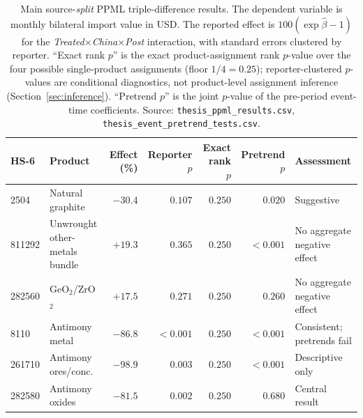 \begin{table}[H]
\centering
\caption{Main source-\emph{split} PPML triple-difference results. The
dependent variable is monthly bilateral import value in USD. The reported
effect is $100(\exp\hat\beta-1)$ for the
\textit{Treated}$\times$\textit{China}$\times$\textit{Post} interaction,
with standard errors clustered by reporter. ``Exact rank $p$'' is the
exact product-assignment rank $p$-value over the four possible
single-product assignments (floor $1/4=0.25$); reporter-clustered
$p$-values are conditional diagnostics, not product-level assignment
inference (Section~\ref{sec:inference}). ``Pretrend $p$'' is the joint
$p$-value of the pre-period event-time coefficients. Source:
\texttt{thesis\_ppml\_results.csv}, \texttt{thesis\_event\_pretrend\_tests.csv}.}
\label{tab:main_ddd}
\footnotesize
\begin{tabular}{llrrrrl}
\toprule
HS-6 & Product & Effect (\%) & Reporter $p$ & Exact rank $p$ & Pretrend $p$ & Assessment \\
\midrule
2504 & Natural graphite & $-30.4$ & $0.107$ & $0.250$ & $0.020$ & Suggestive \\
811292 & Unwrought other-metals bundle & $+19.3$ & $0.365$ & $0.250$ & $<0.001$ & No aggregate negative effect \\
282560 & GeO$_2$/ZrO$_2$ & $+17.5$ & $0.271$ & $0.250$ & $0.260$ & No aggregate negative effect \\
8110 & Antimony metal & $-86.8$ & $<0.001$ & $0.250$ & $<0.001$ & Consistent; pretrends fail \\
261710 & Antimony ores/conc. & $-98.9$ & $0.003$ & $0.250$ & $<0.001$ & Descriptive only \\
282580 & Antimony oxides & $-81.5$ & $0.002$ & $0.250$ & $0.680$ & Central result \\
\bottomrule
\end{tabular}
\end{table}
